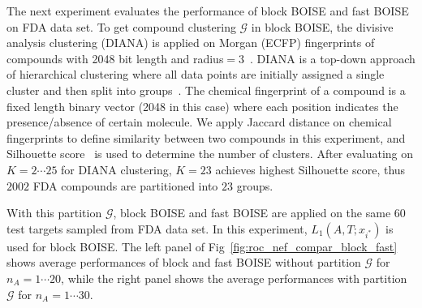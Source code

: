 \documentclass[11pt,a4paper]{article}
\theoremstyle{plain}
\begin{document}
The next experiment evaluates the performance of block BOISE and fast BOISE on FDA data set. 
To get compound clustering $\mathcal G$ in block BOISE, the divisive analysis clustering (DIANA) is applied on Morgan (ECFP) fingerprints of compounds with 2048 bit length and radius$=3$~\citep{fingerprints_rogers_2010}.
DIANA is a top-down approach of hierarchical clustering where all data points are initially assigned a single cluster and then split into groups~\citep{kaufman_finding_2005}. 
The chemical fingerprint of a compound is a fixed length binary vector (2048 in this case) where each position indicates the presence/absence of certain molecule. We apply Jaccard distance on chemical fingerprints  to define similarity between two compounds in this experiment, and Silhouette score~\citep{Rousseeuw_Silhouettes_1987} is used to determine the number of clusters. After evaluating on $K=2\cdots 25$ for DIANA clustering, $K=23$ achieves highest Silhouette score, thus $2002$ FDA compounds are partitioned into $23$ groups. 

With this partition $\mathcal G$, block BOISE and fast BOISE are applied on the same $60$ test targets sampled from FDA data set. In this experiment, $L_1(A, T;x_{i^*})$ is used for block BOISE. The left panel of Fig~\ref{fig:roc_nef_compar_block_fast} shows average performances of block and fast BOISE without partition $\mathcal G$ for $n_A = 1\cdots 20$, while the right panel shows the average performances with partition $\mathcal G$ for $n_A = 1\cdots 30$. 
\end{document}
